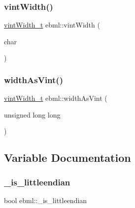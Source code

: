 \mbox{\label{namespaceebml_a025ed44f4346fdb6573b2bf336797f27}} 
\subsubsection{\texorpdfstring{vint\+Width()}{vintWidth()}}
{\footnotesize\ttfamily \mbox{\hyperlink{namespaceebml_a2ccdfb60b23efb51fe07f9d066e23604}{vint\+Width\+\_\+t}} ebml\+::vint\+Width (\begin{DoxyParamCaption}\item[{char}]{ }\end{DoxyParamCaption})}

\mbox{\label{namespaceebml_a39e20a7de94c1f11f941e6cf63af370c}} 
\subsubsection{\texorpdfstring{width\+As\+Vint()}{widthAsVint()}}
{\footnotesize\ttfamily \mbox{\hyperlink{namespaceebml_a2ccdfb60b23efb51fe07f9d066e23604}{vint\+Width\+\_\+t}} ebml\+::width\+As\+Vint (\begin{DoxyParamCaption}\item[{unsigned long}]{long }\end{DoxyParamCaption})}



\subsection{Variable Documentation}
\mbox{\label{namespaceebml_a3dca826d4a08dfedbd01e9aa1c09bc1e}} 
\subsubsection{\texorpdfstring{\+\_\+is\+\_\+littleendian}{\_is\_littleendian}}
{\footnotesize\ttfamily bool ebml\+::\+\_\+is\+\_\+littleendian}

\mbox{\label{namespaceebml_ad196ce572692673a986be2bdabf9907b}} 
